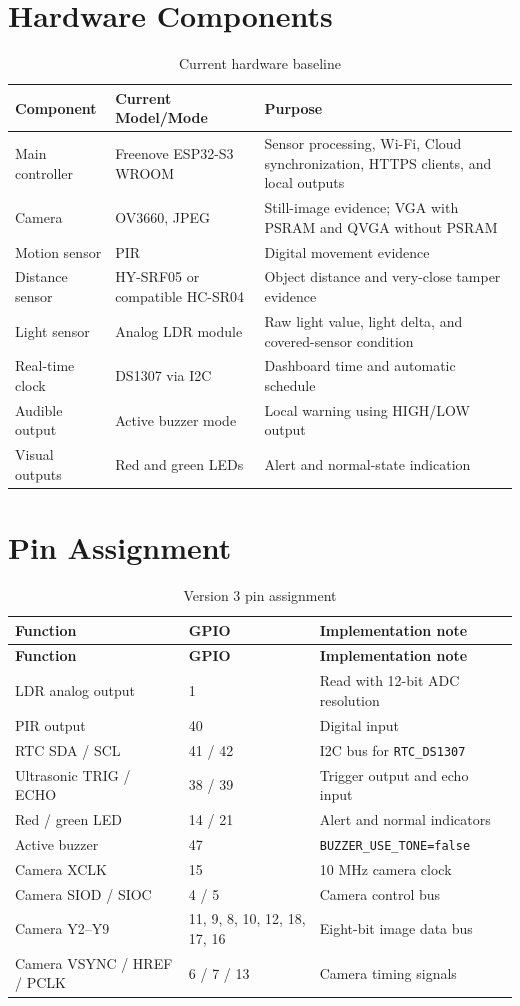 \documentclass[11pt,a4paper]{report}
\begin{document}
\section{Hardware Components}
\begin{table}[H]
\centering
\caption{Current hardware baseline}
\begin{tabularx}{\textwidth}{p{3.2cm}p{3.8cm}X}
\toprule
\textbf{Component} & \textbf{Current Model/Mode} & \textbf{Purpose}\\
\midrule
Main controller & Freenove ESP32-S3 WROOM & Sensor processing, Wi-Fi,
Cloud synchronization, HTTPS clients, and local outputs\\
Camera & OV3660, JPEG & Still-image evidence; VGA with PSRAM and QVGA
without PSRAM\\
Motion sensor & PIR & Digital movement evidence\\
Distance sensor & HY-SRF05 or compatible HC-SR04 & Object distance and
very-close tamper evidence\\
Light sensor & Analog LDR module & Raw light value, light delta, and
covered-sensor condition\\
Real-time clock & DS1307 via I2C & Dashboard time and automatic schedule\\
Audible output & Active buzzer mode & Local warning using HIGH/LOW output\\
Visual outputs & Red and green LEDs & Alert and normal-state indication\\
\bottomrule
\end{tabularx}
\end{table}

\section{Pin Assignment}
\begin{longtable}{p{3.5cm}p{3.0cm}p{7.0cm}}
\caption{Version 3 pin assignment}\\
\toprule
\textbf{Function} & \textbf{GPIO} & \textbf{Implementation note}\\
\midrule
\endfirsthead
\toprule
\textbf{Function} & \textbf{GPIO} & \textbf{Implementation note}\\
\midrule
\endhead
LDR analog output & 1 & Read with 12-bit ADC resolution\\
PIR output & 40 & Digital input\\
RTC SDA / SCL & 41 / 42 & I2C bus for \texttt{RTC\_DS1307}\\
Ultrasonic TRIG / ECHO & 38 / 39 & Trigger output and echo input\\
Red / green LED & 14 / 21 & Alert and normal indicators\\
Active buzzer & 47 & \texttt{BUZZER\_USE\_TONE=false}\\
Camera XCLK & 15 & 10 MHz camera clock\\
Camera SIOD / SIOC & 4 / 5 & Camera control bus\\
Camera Y2--Y9 & 11, 9, 8, 10, 12, 18, 17, 16 & Eight-bit image data bus\\
Camera VSYNC / HREF / PCLK & 6 / 7 / 13 & Camera timing signals\\
\bottomrule
\end{longtable}
\end{document}
